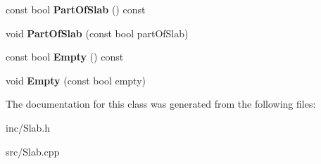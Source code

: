 \begin{DoxyCompactItemize}
\item 
\hypertarget{classCSlab_a776b5e80c09215694dfd3c0fb6cf13c7}{const bool {\bfseries Part\-Of\-Slab} () const }\label{classCSlab_a776b5e80c09215694dfd3c0fb6cf13c7}

\item 
\hypertarget{classCSlab_a9e84286ba37ec4c4c6707303ce4c7dbc}{void {\bfseries Part\-Of\-Slab} (const bool part\-Of\-Slab)}\label{classCSlab_a9e84286ba37ec4c4c6707303ce4c7dbc}

\item 
\hypertarget{classCSlab_afe56c35268d3c8edd8bad05fd44662fb}{const bool {\bfseries Empty} () const }\label{classCSlab_afe56c35268d3c8edd8bad05fd44662fb}

\item 
\hypertarget{classCSlab_a34b2bd7c751c80f9e79fd99a289686d5}{void {\bfseries Empty} (const bool empty)}\label{classCSlab_a34b2bd7c751c80f9e79fd99a289686d5}

\end{DoxyCompactItemize}


The documentation for this class was generated from the following files\-:\begin{DoxyCompactItemize}
\item 
inc/Slab.\-h\item 
src/Slab.\-cpp\end{DoxyCompactItemize}
